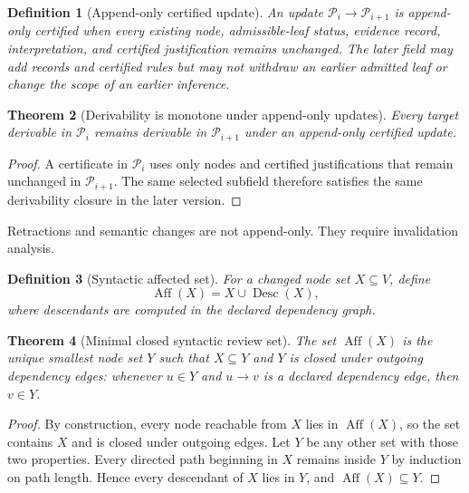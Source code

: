 \documentclass[11pt,oneside]{article}
\theoremstyle{komorebiplain}
\newtheorem{theorem}{Theorem}[section]
\theoremstyle{komorebidefinition}
\newtheorem{definition}[theorem]{Definition}
\theoremstyle{komorebiremark}
\newcommand{\Pcal}{\mathcal P}
\newcommand{\Desc}{\operatorname{Desc}}
\begin{document}
\begin{definition}[Append-only certified update]
\label{res:15:2}
An update $\Pcal_i\to\Pcal_{i+1}$ is append-only certified when every existing node, admissible-leaf status, evidence record, interpretation, and certified justification remains unchanged. The later field may add records and certified rules but may not withdraw an earlier admitted leaf or change the scope of an earlier inference.
\end{definition}

\begin{theorem}[Derivability is monotone under append-only updates]
\label{res:15:3}
Every target derivable in $\Pcal_i$ remains derivable in $\Pcal_{i+1}$ under an append-only certified update.
\end{theorem}

\begin{proof}
A certificate in $\Pcal_i$ uses only nodes and certified justifications that remain unchanged in $\Pcal_{i+1}$. The same selected subfield therefore satisfies the same derivability closure in the later version.
\end{proof}

Retractions and semantic changes are not append-only. They require invalidation analysis.

\begin{definition}[Syntactic affected set]
\label{res:15:4}
For a changed node set $X\subseteq V$, define
\[
\operatorname{Aff}(X)=X\cup\Desc(X),
\]
where descendants are computed in the declared dependency graph.
\end{definition}

\begin{theorem}[Minimal closed syntactic review set]
\label{res:15:5}
The set $\operatorname{Aff}(X)$ is the unique smallest node set $Y$ such that $X\subseteq Y$ and $Y$ is closed under outgoing dependency edges: whenever $u\in Y$ and $u\to v$ is a declared dependency edge, then $v\in Y$.
\end{theorem}

\begin{proof}
By construction, every node reachable from $X$ lies in $\operatorname{Aff}(X)$, so the set contains $X$ and is closed under outgoing edges. Let $Y$ be any other set with those two properties. Every directed path beginning in $X$ remains inside $Y$ by induction on path length. Hence every descendant of $X$ lies in $Y$, and $\operatorname{Aff}(X)\subseteq Y$.
\end{proof}
\end{document}
